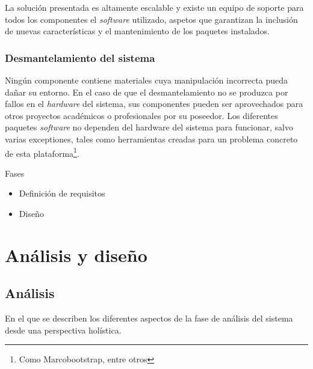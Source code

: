 La solución presentada es altamente escalable y existe un equipo de soporte para todos los componentes el \textit{software} utilizado, aspetos que garantizan la inclusión de nuevas características y el mantenimiento de los paquetes instalados.  

\subsection{Desmantelamiento del sistema}

Ningún componente contiene materiales cuya manipulación incorrecta pueda dañar su entorno. En el caso de que el desmantelamiento no se produzca por fallos en el \textit{hardware} del sistema, sus componentes pueden ser aprovechados para otros proyectos académicos o profesionales por su poseedor. Los diferentes paquetes \textit{software} no dependen del hardware del sistema para funcionar, salvo varias exceptiones, tales como herramientas creadas para un problema concreto de esta plataforma\footnote{Como Marcobootstrap, entre otros}.

Fases
\begin{itemize}
  \item Definición de requisitos
  \item Diseño
\end{itemize}





\chapter{Análisis y diseño}
\label{chapter:analisis}

\section{Análisis}
\begin{cabstract}
En el que se describen los diferentes aspectos de la fase de análisis del sistema desde una perspectiva holística.
\end{cabstract}

